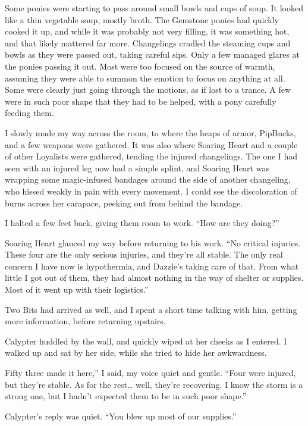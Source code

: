 Some ponies were starting to pass around small bowls and cups of soup. It looked like a thin vegetable soup, mostly broth. The Gemstone ponies had quickly cooked it up, and while it was probably not very filling, it was something hot, and that likely mattered far more. Changelings cradled the steaming cups and bowls as they were passed out, taking careful sips. Only a few managed glares at the ponies passing it out. Most were too focused on the source of warmth, assuming they were able to summon the emotion to focus on anything at all. Some were clearly just going through the motions, as if lost to a trance. A few were in such poor shape that they had to be helped, with a pony carefully feeding them.

I slowly made my way across the room, to where the heaps of armor, PipBucks, and a few weapons were gathered. It was also where Soaring Heart and a couple of other Loyalists were gathered, tending the injured changelings. The one I had seen with an injured leg now had a simple splint, and Soaring Heart was wrapping some magic-infused bandages around the side of another changeling, who hissed weakly in pain with every movement. I could see the discoloration of burns across her carapace, peeking out from behind the bandage.

I halted a few feet back, giving them room to work. “How are they doing?”

Soaring Heart glanced my way before returning to his work. “No critical injuries. These four are the only serious injuries, and they’re all stable. The only real concern I have now is hypothermia, and Dazzle’s taking care of that. From what little I got out of them, they had almost nothing in the way of shelter or supplies. Most of it went up with their logistics.”

Two Bits had arrived as well, and I spent a short time talking with him, getting more information, before returning upstairs.

Calypter huddled by the wall, and quickly wiped at her cheeks as I entered. I walked up and sat by her side, while she tried to hide her awkwardness.

\leavevmode{}Fifty three made it here,” I said, my voice quiet and gentle. “Four were injured, but they’re stable. As for the rest… well, they’re recovering. I know the storm is a strong one, but I hadn’t expected them to be in such poor shape.”

Calypter’s reply was quiet. “You blew up most of our supplies.”

